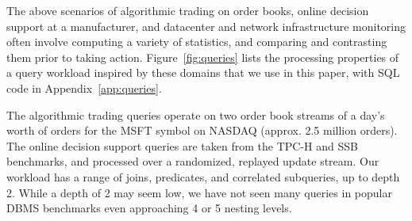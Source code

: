 \vspace{1mm}
The above scenarios of algorithmic trading on order books, online
decision support at a manufacturer, and datacenter and network infrastructure
monitoring often involve computing a variety of statistics,
and comparing and contrasting them prior to taking action.
Figure~\ref{fig:queries} lists the processing properties of a query workload
inspired by these domains that we use in this paper, with SQL code in
Appendix~\ref{app:queries}.

The algorithmic trading queries operate on two order book streams of a day's
worth of orders for the MSFT symbol on NASDAQ (approx. 2.5 million orders). The
online decision support queries are taken from the TPC-H and SSB benchmarks, and
processed over a randomized, replayed update stream.
Our workload has a range of joins, predicates, and correlated
subqueries, up to depth 2. While a depth of 2 may seem low, we have not seen
many queries in popular DBMS benchmarks even approaching 4 or 5 nesting levels.

